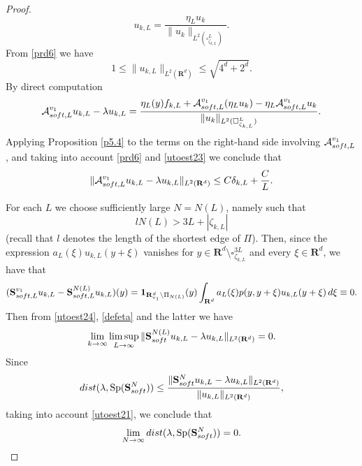 \documentclass[10pt,a4paper]{amsart}
\DeclareMathOperator{\Sp}{Sp}
\def\RR{\R}
\newcommand\soft{{\rm soft}}
\newcommand{\R}{\mathbf{R}}
\renewcommand\AA{{\mathbf S}}
\begin{document}
\begin{proof}
\begin{equation}
		u_{k,L} =\frac{\eta_L  u_k}{\|u_k\|_{L^2(\square^L_{\zeta_{k,L} })}}.
	\end{equation}	
	From \eqref{prd6} we have
	\begin{equation} \label{utoest21}
		1 \leq \|u_{k,L}\|_{L^2(\mathbf{R}^d)} \leq \sqrt{4^d+  2^d}.
	\end{equation}
	By direct computation
	\begin{equation*}%
		\mathcal{A}_{\rm soft,L}^{v_1} u_{k,L}-\lambda u_{k,L}
		 = \frac{\eta_L(y)f_{k,L} + \mathcal{A}_{\rm soft,L}^{v_1} (\eta_L u_k)  - \eta_L    \mathcal{A}_{\rm soft,L}^{v_1} u_k }{\|u_k\|_{L^2(\square^L_{\zeta_{k,L}})}}  .
	\end{equation*}
Applying Proposition \ref{p5.4} to the terms on the right-hand side involving 	$\mathcal{A}_{\rm soft,L}^{v_1}$, and taking into account \eqref{prd6} and \eqref{utoest23}
 we conclude that
	\begin{equation} \label{utoest24}
		\| \mathcal{A}_{\rm soft,L}^{v_1} u_{k,L}-\lambda u_{k,L}\|_{L^2(\RR^d)} \leq C \delta_{k,L} + \frac{C}{L}.
	\end{equation}
	
	
	
	


For each $L$ we choose sufficiently large $N = N(L)$, namely such that
\begin{equation}\label{104a}
	lN(L) >3L+ |\zeta_{k,L}|
\end{equation}
   (recall that $l$ denotes the length of the shortest edge of $\Pi$). Then, since the expression
$a_L (\xi) u_{k,L}(y+\xi)$ vanishes for  $y \in \R^d \setminus\square^{3L}_{\zeta_{k,L}} $  and every $\xi \in \mathbf{R}^d$,  we have that
\begin{equation*}
		(\AA_{\soft,L} ^{v_1}u_{k,L} -\AA_{\soft,L}^{N(L)}  u_{k,L})(y) = \mathbf{1}_{\mathbf{R}^d_{v_1}\backslash \Pi_{N(L)}} (y) \int_{\R^d}  a_L(\xi) p(y,y+\xi) u_{k,L}(y+\xi) \, d\xi \equiv 0 	.
\end{equation*}
Then from   \eqref{utoest24}, \eqref{defeta} and the latter we have
	\begin{equation} \label{ana1}
		 \lim_{k \to \infty} \limsup_{L\to \infty}   \|\AA_\soft^{N(L)} u_{k,L} -\lambda u_{k,L}\|_{L^2(\RR^d)}=0.   	
	\end{equation} 	
	Since
	\begin{equation*}%
		\textrm{dist} (\lambda,\Sp (\AA_\soft^N) ) \leq \frac{\|\AA_\soft^N u_{k,L} -\lambda u_{k,L}\|_{L^2(\RR^d)}}{\|u_{k,L}\|_{L^2(\RR^d)}}, 	
	\end{equation*} 	
	taking into account \eqref{utoest21}, we conclude that
	\begin{equation*}
		\lim_{N \to \infty} \textrm{dist}  (\lambda,\Sp (\AA_\soft^N) )=0.
	\end{equation*}
	

\end{proof}
\end{document}
